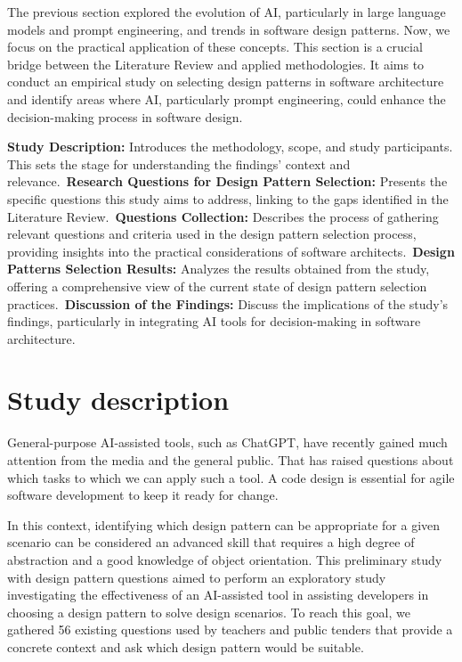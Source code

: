 The previous section explored the evolution of AI, particularly in large language models and prompt engineering, and trends in software design patterns. Now, we focus on the practical application of these concepts. This section is a crucial bridge between the Literature Review and applied methodologies. It aims to conduct an empirical study on selecting design patterns in software architecture and identify areas where AI, particularly prompt engineering, could enhance the decision-making process in software design.

\textbf{Study Description: }Introduces the methodology, scope, and study participants. This sets the stage for understanding the findings' context and relevance.~\textbf{Research Questions for Design Pattern Selection: }Presents the specific questions this study aims to address, linking to the gaps identified in the Literature Review.~\textbf{Questions Collection: }Describes the process of gathering relevant questions and criteria used in the design pattern selection process, providing insights into the practical considerations of software architects.~\textbf{Design Patterns Selection Results: }Analyzes the results obtained from the study, offering a comprehensive view of the current state of design pattern selection practices.~\textbf{Discussion of the Findings: }Discuss the implications of the study’s findings, particularly in integrating AI tools for decision-making in software architecture.

\section{Study description}

General-purpose AI-assisted tools, such as ChatGPT, have recently gained much attention from the media and the general public. That has raised questions about which tasks to which we can apply such a tool. A code design is essential for agile software development to keep it ready for change. 

In this context, identifying which design pattern can be appropriate for a given scenario can be considered an advanced skill that requires a high degree of abstraction and a good knowledge of object orientation. This preliminary study with design pattern questions aimed to perform an exploratory study investigating the effectiveness of an AI-assisted tool in assisting developers in choosing a design pattern to solve design scenarios. To reach this goal, we gathered 56 existing questions used by teachers and public tenders that provide a concrete context and ask which design pattern would be suitable. 

